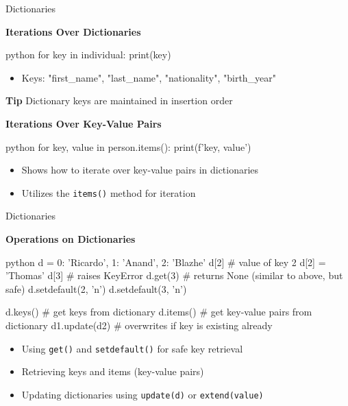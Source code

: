 \documentclass[
	11pt, 
]{beamer}
\begin{document}

\begin{frame}[fragile]{Dictionaries}

\textbf{Iterations Over Dictionaries}

\begin{mintedbox}{python}
for key in individual:
    print(key)
\end{mintedbox}

\begin{itemize}
    \item Keys: "first\_name", "last\_name", "nationality", "birth\_year"
\end{itemize}

\begin{exampleblock}{\textbf{Tip}}
    Dictionary keys are maintained in insertion order
\end{exampleblock}

\textbf{Iterations Over Key-Value Pairs}
\begin{mintedbox}{python}
for key, value in person.items():
    print(f'{key}, {value}')
\end{mintedbox}

\begin{itemize}
    \item Shows how to iterate over key-value pairs in dictionaries
    \item Utilizes the \texttt{items()} method for iteration
\end{itemize}
\end{frame}


\begin{frame}[fragile]{Dictionaries}

\textbf{Operations on Dictionaries}

\begin{mintedbox}{python}
d = {0: 'Ricardo', 1: 'Anand', 2: 'Blazhe'}
d[2] # value of key 2
d[2] = 'Thomas'
d[3]  # raises KeyError
d.get(3)  # returns None (similar to above, but safe)
d.setdefault(2, 'n')
d.setdefault(3, 'n')

d.keys() # get keys from dictionary
d.items() # get key-value pairs from dictionary
d1.update(d2) # overwrites if key is existing already
\end{mintedbox}

\begin{itemize}
    \item Using \texttt{get()} and \texttt{setdefault()} for safe key retrieval
    \item Retrieving keys and items (key-value pairs)
    \item Updating dictionaries using \texttt{update(d)} or \texttt{extend(value)}
\end{itemize}


\end{frame}
\end{document}
